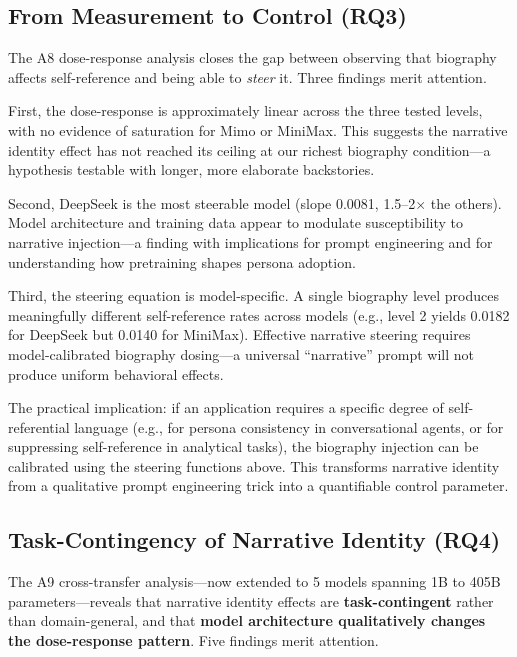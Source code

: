 \documentclass[11pt,a4paper]{article}
\begin{document}
\subsection{From Measurement to Control (RQ3)}

The A8 dose-response analysis closes the gap between observing that biography affects self-reference and being able to \textit{steer} it. Three findings merit attention.

First, the dose-response is approximately linear across the three tested levels, with no evidence of saturation for Mimo or MiniMax. This suggests the narrative identity effect has not reached its ceiling at our richest biography condition---a hypothesis testable with longer, more elaborate backstories.

Second, DeepSeek is the most steerable model (slope 0.0081, 1.5--2$\times$ the others). Model architecture and training data appear to modulate susceptibility to narrative injection---a finding with implications for prompt engineering and for understanding how pretraining shapes persona adoption.

Third, the steering equation is model-specific. A single biography level produces meaningfully different self-reference rates across models (e.g., level 2 yields 0.0182 for DeepSeek but 0.0140 for MiniMax). Effective narrative steering requires model-calibrated biography dosing---a universal ``narrative'' prompt will not produce uniform behavioral effects.

The practical implication: if an application requires a specific degree of self-referential language (e.g., for persona consistency in conversational agents, or for suppressing self-reference in analytical tasks), the biography injection can be calibrated using the steering functions above. This transforms narrative identity from a qualitative prompt engineering trick into a quantifiable control parameter.

\subsection{Task-Contingency of Narrative Identity (RQ4)}

The A9 cross-transfer analysis---now extended to 5 models spanning 1B to 405B parameters---reveals that narrative identity effects are \textbf{task-contingent} rather than domain-general, and that \textbf{model architecture qualitatively changes the dose-response pattern}. Five findings merit attention.
\end{document}

